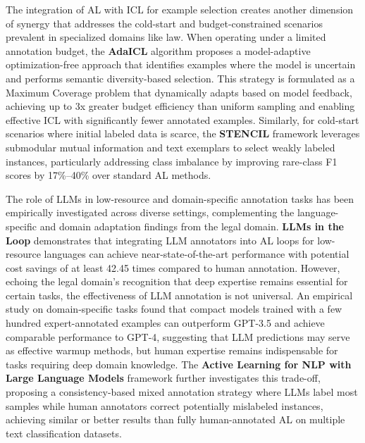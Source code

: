 \documentclass[11pt]{article}
\begin{document}
The integration of AL with ICL for example selection creates another dimension of synergy that addresses the cold-start and budget-constrained scenarios prevalent in specialized domains like law. When operating under a limited annotation budget, the \textbf{AdaICL} algorithm \cite{ref584} proposes a model-adaptive optimization-free approach that identifies examples where the model is uncertain and performs semantic diversity-based selection. This strategy is formulated as a Maximum Coverage problem that dynamically adapts based on model feedback, achieving up to 3x greater budget efficiency than uniform sampling and enabling effective ICL with significantly fewer annotated examples. Similarly, for cold-start scenarios where initial labeled data is scarce, the \textbf{STENCIL} framework \cite{ref585} leverages submodular mutual information and text exemplars to select weakly labeled instances, particularly addressing class imbalance by improving rare-class F1 scores by 17\%--40\% over standard AL methods.

The role of LLMs in low-resource and domain-specific annotation tasks has been empirically investigated across diverse settings, complementing the language-specific and domain adaptation findings from the legal domain. \textbf{LLMs in the Loop} \cite{ref576} demonstrates that integrating LLM annotators into AL loops for low-resource languages can achieve near-state-of-the-art performance with potential cost savings of at least 42.45 times compared to human annotation. However, echoing the legal domain's recognition that deep expertise remains essential for certain tasks, the effectiveness of LLM annotation is not universal. An empirical study on domain-specific tasks \cite{ref586} found that compact models trained with a few hundred expert-annotated examples can outperform GPT-3.5 and achieve comparable performance to GPT-4, suggesting that LLM predictions may serve as effective warmup methods, but human expertise remains indispensable for tasks requiring deep domain knowledge. The \textbf{Active Learning for NLP with Large Language Models} framework \cite{ref587} further investigates this trade-off, proposing a consistency-based mixed annotation strategy where LLMs label most samples while human annotators correct potentially mislabeled instances, achieving similar or better results than fully human-annotated AL on multiple text classification datasets.
\end{document}
